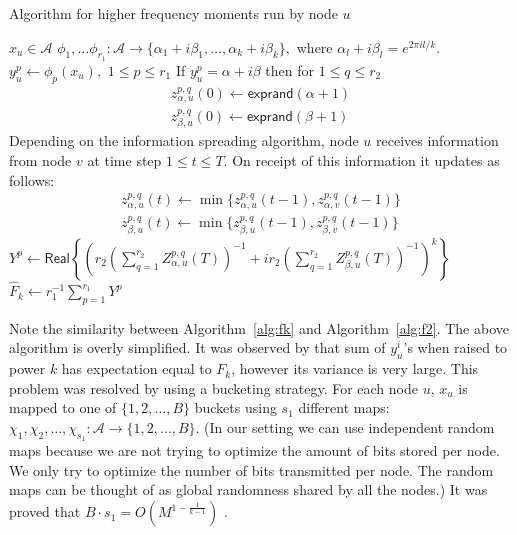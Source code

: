 \documentclass[10pt,twosided,a4paper,draft,onecolumn]{article}
\newcommand{\exprand}[1]{\mathsf{exprand}(#1)}
\newcommand{\re}[1]{\mathsf{Real}#1}
\begin{document}
\begin{algorithm} 
  \caption{Algorithm for higher frequency moments run by node
    $u$}{\label{alg:fk}} 
  \begin{algorithmic}[1] 
    \REQUIRE $x_u \in \mathcal{A}$
    \hspace*{0.5cm}$\phi_1, \ldots \phi_{r_1}: \mathcal{A} \rightarrow
    \{\alpha_1 +i\beta_1, \ldots ,\alpha_k+i\beta_k\},$ where
    $\alpha_l +i\beta_l = e^{2 \pi i l/k}.$  
    \STATE  $y_{u}^p \gets \phi_p(x_u),$ $1 \leq p \leq r_1$ 
    \STATE If $ y_{u}^p = \alpha +i\beta$ then for $1 \leq q \leq r_2$ 
    \begin{align*}
      z_{\alpha,u}^{p,q}(0) \gets \exprand{\alpha+1} \\
      z_{\beta,u}^{p,q}(0) \gets \exprand{\beta+1} 
    \end{align*}
    \STATE Depending on the information spreading algorithm, node $u$
    receives information from  node $v$ at time step $1 \leq t \leq T.$
    On receipt of this information it updates as follows:  
    \begin{align*}
      z_{\alpha,u}^{p,q}(t) \gets
      \min\{z_{\alpha,u}^{p,q}(t-1),z_{\alpha,v}^{p,q}(t-1)\} \\ 
      z_{\beta,u}^{p,q}(t) \gets
      \min\{z_{\beta,u}^{p,q}(t-1),z_{\beta,v}^{p,q}(t-1)\}  
    \end{align*}
    \STATE $Y^p \gets \re{ \left\{
        \left(r_2 \left(\sum\limits_{q=1}^{r_2}
            Z_{\alpha,u}^{p,q}(T)\right)^{-1}
          +i r_2 \left(\sum\limits_{q=1}^{r_2} Z_{\beta,u}^{p,q}(T)\right)^{-1}
        \right)^k \right\}}$ 
    \STATE $\hat{F}_k \gets  r_1^{-1} \sum\limits_{p=1}^{r_1}Y^p$
  \end{algorithmic}
\end{algorithm}

Note the similarity between Algorithm~\ref{alg:fk} and
Algorithm~\ref{alg:f2}. The above algorithm is overly simplified.  It
was observed by \cite{Ganguly04} that sum of $y_u^i$'s when raised to
power $k$ has expectation equal to $F_k$, however its variance is very
large. This problem was resolved by using a bucketing strategy. For
each node $u$, $x_u$ is mapped to one of $\{1,2,\ldots, B\}$ buckets
using $s_1$ different maps: $\chi_1, \chi_2,\ldots,\chi_{s_1}:
\mathcal{A} \rightarrow \{1,2,\ldots, B\}$. (In our setting we can use
independent random maps because we are not trying to optimize the
amount of bits stored per node. We only try to optimize the number of
bits transmitted per node. The random maps can be thought of as global
randomness shared by all the nodes.) It was proved that $B\cdot s_1 =
O(M^{1-\frac{1}{k-1}})$ \cite{Ganguly04}.
\end{document}
